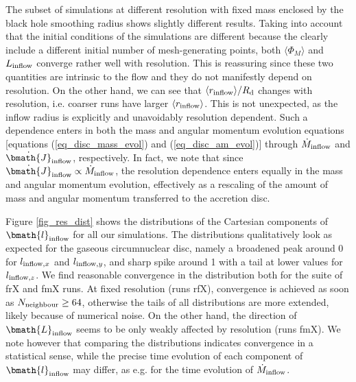 \documentclass[a4paper,fleqn,usenatbib]{mnras}
\begin{document}
The subset of simulations at different resolution with fixed mass enclosed by the black hole smoothing radius shows slightly different results.
Taking into account that the initial conditions of the simulations are different because the clearly include a different initial number of mesh-generating points, both $\langle \Phi_{M} \rangle$ and $L_{\rm inflow}$ converge rather well with resolution.
This is reassuring since these two quantities are intrinsic to the flow and they do not manifestly depend on resolution.
On the other hand, we can see that $\langle r_{\rm inflow} \rangle / R_{\rm d}$ changes with resolution, i.e. coarser runs have larger $\langle r_{\rm inflow} \rangle$.
This is not unexpected, as the inflow radius is explicitly and unavoidably resolution dependent.
Such a dependence enters in both the mass and angular momentum evolution equations [equations (\ref{eq_disc_mass_evol}) and (\ref{eq_disc_am_evol})] through $\dot{M}_{\rm inflow}$ and $\dot{\bmath{J}}_{\rm inflow}$, respectively.
In fact, we note that since $\dot{\bmath{J}}_{\rm inflow} \propto \dot{M}_{\rm inflow}$, the resolution dependence enters equally in the mass and angular momentum evolution, effectively as a rescaling of the amount of mass and angular momentum transferred to the accretion disc.

Figure \ref{fig_res_dist} shows the distributions of the Cartesian components of $\bmath{l}_{\rm inflow}$ for all our simulations.
The distributions qualitatively look as expected for the gaseous circumnuclear disc, namely a broadened peak around 0 for $l_{{\rm inflow}, x}$ and $l_{{\rm inflow}, y}$, and sharp spike around 1 with a tail at lower values for $l_{{\rm inflow}, z}$.
We find reasonable convergence in the distribution both for the suite of frX and fmX runs.
At fixed resolution (runs rfX), convergence is achieved as soon as $N_{\rm neighbour} \geq 64$, otherwise the tails of all distributions are more extended, likely because of numerical noise.
On the other hand, the direction of $\bmath{L}_{\rm inflow}$ seems to be only weakly affected by resolution (runs fmX).
We note however that comparing the distributions indicates convergence in a statistical sense, while the precise time evolution of each component of $\bmath{l}_{\rm inflow}$ may differ, as e.g. for the time evolution of $\dot{M}_{\rm inflow}$.
\end{document}
